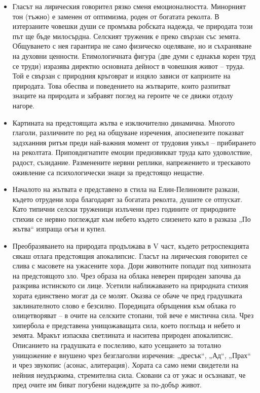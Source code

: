 \documentclass[12pt,a4paper]{article}
\begin{document}
\vspace{0.1cm}
\begin{itemize}[leftmargin=*, noitemsep, topsep=2pt, parsep=0pt]
    \item Гласът на лирическия говорител рязко сменя емоционалността. Минорният тон (тъжно) е заменен от оптимизма, роден от богатата реколта. В изтерзаните човешки души се промъква робската надежда, че природата този път ще бъде милосърдна. Селският труженик е преко свързан със земята. Общуването с нея гарантира не само физическо оцеляване, но и съхраняване на духовни ценности. Етимологичната фигура (две думи с еднакъв корен труд се труди) изразява директно основната дейност в човешкия живот – труда. Той е свързан с природния кръговрат и изцяло зависи от капризите на природата. Това обеспва и поведението на жътварите, които разпитват знаците на природата и забравят поглед на героите че се движи отдолу нагоре.
    \vspace{0.1cm}
    \item Картината на предстоящата жътва е изключително динамична. Многото глаголи, различните по ред на общуване изречения, апосиепезите показват задзханния ритъм преди най-важния момент от трудовия уикъл – прибирането на реколтата. Приповдигнатите емоции предизвикват труда като удоволствие, радост, съзидание. Разменените нервни реплики, напрежението и трескавото оживление са психологически знаци за предстоящо нещастие.
    \vspace{0.1cm}
    \item Началото на жътвата е представено в стила на Елин-Пелиновите разкази, където отрудени хора благодарят за богатата реколта, душите се отпускат. Като типични селски труженици излъчени през годините от природните стихии се нервно поглеждат към небето където слизенето като в разказа „По жътва“ изпраща огън и купел.
    \vspace{0.1cm}
    \item Преобразяването на природата продължава в V част, където ретроспекцията сякаш отлага предстоящия апокалипсис. Гласът на лирическия говорител се слива с масовете на ужасените хора. Дори животните попадат под хипнозата на предстоящото зло. Чрез образа на облака неверен природен започва да разкрива истинското си лице. Усетили наближаването на природната стихия хората единствено могат да се молят. Оказва се обаче че пред градушката заклинателното слово е безсилно. Поредицата обръщения към облака го олицетворяват – в очите на селските стопани, той вече е мистична сила. Чрез хипербола е представена унищожаващата сила, което поглъща и небето и земята. Мракът изпасква светлината и наситева природен апокалипсис. Описанието на градушката е послеливо, като усещането за тотално унищожение е внушено чрез безглаголни изречения: „дресък“, „Ад“, „Прах“ и чрез звукопис (асонас, алитерация). Хората са само неми свидетели на нейния неудържима, стремителна сила. Сковани са от ужас и осъзнават, че пред очите им биват погубени надеждите за по-добър живот.

\end{itemize}
\end{document}
